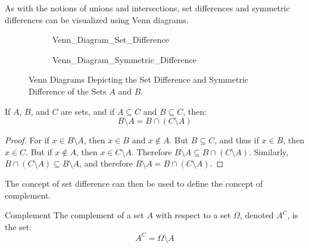 \documentclass[crop=false,class=book,oneside]{standalone}
\begin{document}
            As with the notions of unions and intersections, set differences and
            symmetric differences can be visualized using Venn diagrams.
            \begin{figure}[H]
                \centering
                \captionsetup{type=figure}
                \begin{subfigure}[b]{0.49\textwidth}
                    \centering
                    {Venn_Diagram_Set_Difference}
                \end{subfigure}
                \begin{subfigure}[b]{0.49\textwidth}
                    \centering
                    {Venn_Diagram_Symmetric_Difference}
                \end{subfigure}
                \caption{Venn Diagrams Depicting the Set Difference and
                         Symmetric Difference of the Sets $A$ and $B$.}
                \label{fig:MEASURE_THEORY_Difference_sym_venn_diagram}
            \end{figure}
            \begin{theorem}
                \label{thm:MEASURE_THEORY_SET_DIFFERENCE_AS_INTERSECTION}
                If $A$, $B$, and $C$ are sets, and if $A\subseteq{C}$
                and $B\subseteq{C}$, then:
                \begin{equation}
                    B\setminus{A}=B\cap(C\setminus{A})
                \end{equation}
            \end{theorem}
            \begin{proof}
                For if $x\in{B}\setminus{A}$, then
                $x\in{B}$ and $x\notin{A}$. But
                $B\subseteq{C}$, and thus if $x\in{B}$, then $x\in{C}$.
                But if $x\notin{A}$, then $x\in{C}\setminus{A}$. Therefore
                $B\setminus{A}\subseteq{B}\cap(C\setminus{A})$.
                Similarly, $B\cap(C\setminus{A})\subseteq{B}\setminus{A}$,
                and therefore $B\setminus{A}={B}\cap(C\setminus{A})$.
            \end{proof}
            The concept of set difference can then be used to define the concept of
            complement.
            \begin{ldefinition}{Complement}
                The complement of a set $A$ with respect to a set
                $\Omega$, denoted $A^{C}$, is the set:
                \begin{equation}
                    A^{C}=\Omega\setminus{A}
                \end{equation}
            \end{ldefinition}
\end{document}
